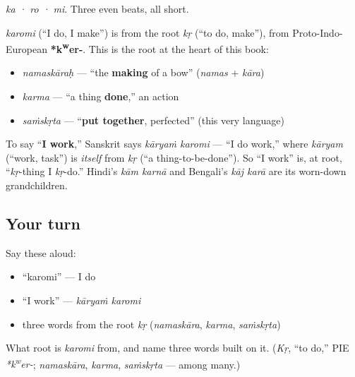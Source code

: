 \begin{sounds}
\emph{ka · ro · mi}. Three even beats, all short.
\end{sounds}

\begin{cousinweb}
\emph{karomi} (\textquotedblleft{}I do, I make\textquotedblright{}) is from the root \emph{kṛ} (\textquotedblleft{}to do, make\textquotedblright{}), from Proto-Indo-European \textbf{*k\textsuperscript{w}er-}. This is the root at the heart of this book:

\begin{itemize}
\raggedright
  \item \emph{namaskāraḥ} — \textquotedblleft{}the \textbf{making} of a bow\textquotedblright{} (\emph{namas} + \emph{kāra})
  \item \emph{karma} — \textquotedblleft{}a thing \textbf{done},\textquotedblright{} an action
  \item \emph{saṁskṛta} — \textquotedblleft{}\textbf{put together}, perfected\textquotedblright{} (this very language)
\end{itemize}

To say \textquotedblleft{}\textbf{I work},\textquotedblright{} Sanskrit says \emph{kāryaṁ karomi} — \textquotedblleft{}I do work,\textquotedblright{} where \emph{kāryam} (\textquotedblleft{}work, task\textquotedblright{}) is \emph{itself} from \emph{kṛ} (\textquotedblleft{}a thing-to-be-done\textquotedblright{}). So \textquotedblleft{}I work\textquotedblright{} is, at root, \textquotedblleft{}\emph{kṛ}-thing I \emph{kṛ}-do.\textquotedblright{} Hindi's \emph{kām karnā} and Bengali's \emph{kāj karā} are its worn-down grandchildren.
\end{cousinweb}

\subsection*{Your turn}
Say these aloud:

\begin{itemize}
\raggedright
  \item \textquotedblleft{}karomi\textquotedblright{} — I do
  \item \textquotedblleft{}I work\textquotedblright{} — \emph{kāryaṁ karomi}
  \item three words from the root \emph{kṛ} (\emph{namaskāra}, \emph{karma}, \emph{saṁskṛta})
\end{itemize}

\begin{tcolorbox}[breakable,colback=teal!4,colframe=teal!35!black,title={Before you move on}]
What root is \emph{karomi} from, and name three words built on it. (\emph{Kṛ}, \textquotedblleft{}to do,\textquotedblright{} PIE \emph{*k\textsuperscript{w}er-}; \emph{namaskāra}, \emph{karma}, \emph{saṁskṛta} — among many.)
\end{tcolorbox}
